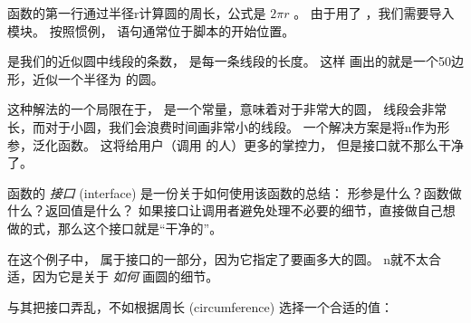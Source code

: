 函数的第一行通过半径r计算圆的周长，公式是 $2 \pi r$ 。
由于用了  ，我们需要导入  模块。
按照惯例， 语句通常位于脚本的开始位置。


 是我们的近似圆中线段的条数，  是每一条线段的长度。
这样  画出的就是一个50边形，近似一个半径为  的圆。


这种解法的一个局限在于，  是一个常量，意味着对于非常大的圆，
线段会非常长，而对于小圆，我们会浪费时间画非常小的线段。
一个解决方案是将n作为形参，泛化函数。
这将给用户（调用  的人）更多的掌控力， 但是接口就不那么干净了。


函数的 \emph{接口} (interface) 是一份关于如何使用该函数的总结：
形参是什么？函数做什么？返回值是什么？
如果接口让调用者避免处理不必要的细节，直接做自己想做的式，那么这个接口就是``干净的''。


在这个例子中，  属于接口的一部分，因为它指定了要画多大的圆。
n就不太合适，因为它是关于 \emph{如何} 画圆的细节。


与其把接口弄乱，不如根据周长 (circumference) 选择一个合适的值：

